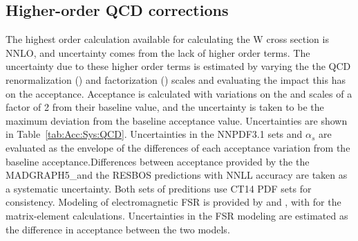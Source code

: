 \subsection{Higher-order QCD corrections}

The highest order calculation available for calculating the W cross section is NNLO, and uncertainty comes from the lack of higher order terms. The uncertainty due to these higher order terms is estimated by varying the the QCD renormalization (\mur) and factorization (\muf) scales and evaluating the impact this has on the acceptance. Acceptance is calculated with variations on the \mur and \muf scales of a factor of 2 from their baseline value, and the uncertainty is taken to be the maximum deviation from the baseline acceptance value. Uncertainties are shown in  Table~\ref{tab:Acc:Sys:QCD}. Uncertainties in the NNPDF3.1 sets and $\alpha_s$ are evaluated as the envelope of the differences of each acceptance variation from the baseline acceptance.Differences between acceptance provided by the the MADGRAPH5\_\aMCATNLO and the RESBOS predictions with NNLL accuracy are taken as a systematic uncertainty. Both sets of preditions use CT14 PDF sets for consistency. Modeling of electromagnetic FSR is provided by \PYTHIA and \PHOTOS, with \POWHEG for the matrix-element calculations. Uncertainties in the FSR modeling are estimated as the difference in acceptance between the two models.




% 
% 
% 
% 


% 
% 
% 

%



% 
% 
% 

